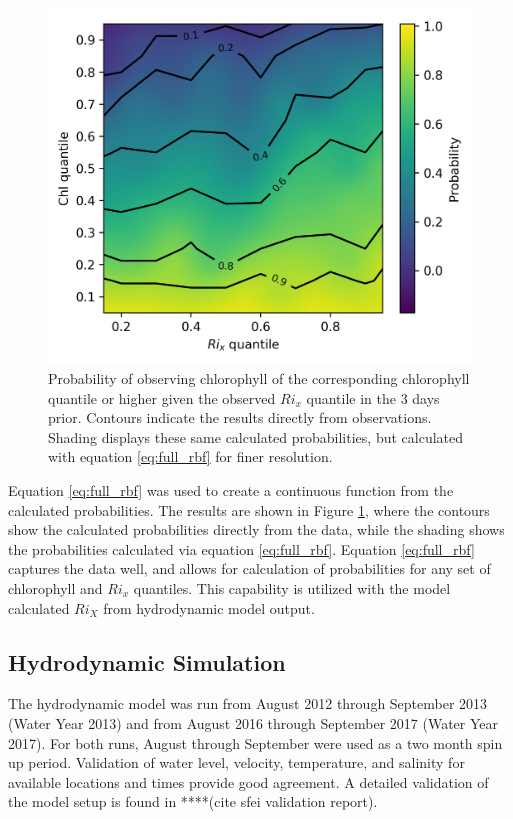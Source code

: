 \documentclass[preprint,review,12pt]{elsarticle}
\begin{document}
\begin{figure}[ht!]
\centering
\includegraphics[width=\textwidth]{Figures/chl_rix_rbf_pdf.png}
\caption{Probability of observing chlorophyll of the corresponding chlorophyll quantile or higher given the observed \(Ri_x\) quantile in the 3 days prior. Contours indicate the results directly from observations. Shading displays these same calculated probabilities, but calculated with equation \ref{eq:full_rbf} for finer resolution.}
\label{fig:chl_pdf}
\end{figure}
\FloatBarrier

Equation \ref{eq:full_rbf} was used to create a continuous function from the calculated probabilities. The results are shown in Figure \ref{fig:chl_pdf}, where the contours show the calculated probabilities directly from the data, while the shading shows the probabilities calculated via equation \ref{eq:full_rbf}. Equation \ref{eq:full_rbf} captures the data well, and allows for calculation of probabilities for any set of chlorophyll and \(Ri_x\) quantiles. This capability is utilized with the model calculated \(Ri_X\) from hydrodynamic model output. 

\subsection{Hydrodynamic Simulation}
The hydrodynamic model was run from August 2012 through September 2013 (Water Year 2013) and from August 2016 through September 2017 (Water Year 2017). For both runs, August through September were used as a two month spin up period. Validation of water level, velocity, temperature, and salinity for available locations and times provide good agreement. A detailed validation of the model setup is found in ****(cite sfei validation report). 
\end{document}
